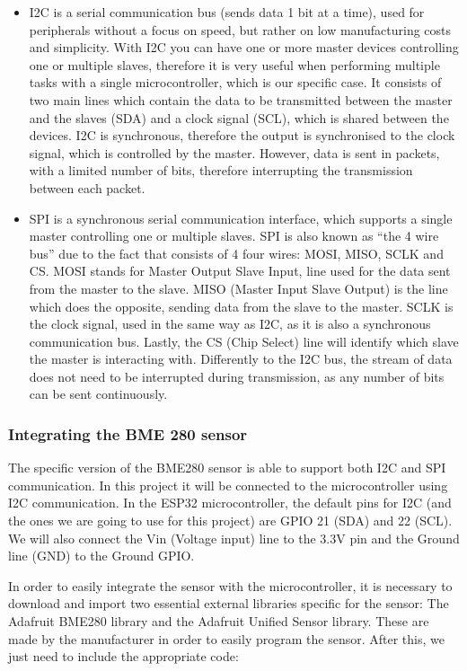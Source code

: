 \documentclass[12pt]{article}
\begin{document}
\begin{itemize}
    \item I2C is a serial communication bus (sends data 1 bit at a time), used for peripherals without a focus on speed, but rather on low manufacturing costs and simplicity. With I2C you can have one or more master devices controlling one or multiple slaves, therefore it is very useful when performing multiple tasks with a single microcontroller, which is our specific case. It consists of two main lines which contain the data to be transmitted between the master and the slaves (SDA) and a clock signal (SCL), which is shared between the devices. I2C is synchronous, therefore the output is synchronised to the clock signal, which is controlled by the master. However, data is sent in packets, with a limited number of bits, therefore interrupting the transmission between each packet.
    \item SPI is a synchronous serial communication interface, which supports a single master controlling one or multiple slaves. SPI is also known as ``the 4 wire bus'' due to the fact that consists of 4 four wires: MOSI, MISO, SCLK and CS. MOSI stands for Master Output Slave Input, line used for the data sent from the master to the slave. MISO (Master Input Slave Output) is the line which does the opposite, sending data from the slave to the master. SCLK is the clock signal, used in the same way as I2C, as it is also a synchronous communication bus. Lastly, the CS (Chip Select) line will identify which slave the master is interacting with. Differently to the I2C bus, the stream of data does not need to be interrupted during transmission, as any number of bits can be sent continuously.
\end{itemize}

\subsubsection{Integrating the BME 280 sensor}

The specific version of the BME280 sensor is able to support both I2C and SPI communication. In this project it will be connected to the microcontroller using I2C communication. In the ESP32 microcontroller, the default pins for I2C (and the ones we are going to use for this project) are GPIO 21 (SDA) and 22 (SCL). We will also connect the Vin (Voltage input) line to the 3.3V pin and the Ground line (GND) to the Ground GPIO.\par

In order to easily integrate the sensor with the microcontroller, it is necessary to download and import two essential external libraries specific for the sensor: The Adafruit BME280 library and the Adafruit Unified Sensor library. These are made by the manufacturer in order to easily program the sensor. After this, we just need to include the appropriate code:
\end{document}
